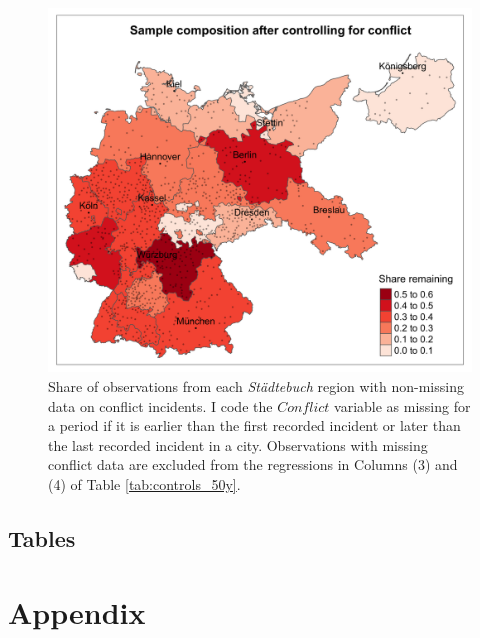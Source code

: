 \documentclass[11pt, a4paper]{article}
\begin{document}
\begin{figure}[ht]
    \centering
    \includegraphics[scale = 0.15]{paper/output/descriptive/map_conflict_NA_50y.png}
    \caption{Share of observations from each \textit{Städtebuch} region with non-missing data on conflict incidents. I code the $Conflict$ variable as missing for a period if it is earlier than the first recorded incident or later than the last recorded incident in a city. Observations with missing conflict data are excluded from the regressions in Columns (3) and (4) of Table \ref{tab:controls_50y}.}
    \label{fig:conflict_map}
\end{figure}

\clearpage
\subsection*{Tables}







\clearpage
\section*{Appendix}

\setcounter{table}{0}
\renewcommand{\thetable}{A\arabic{table}}


\end{document}
